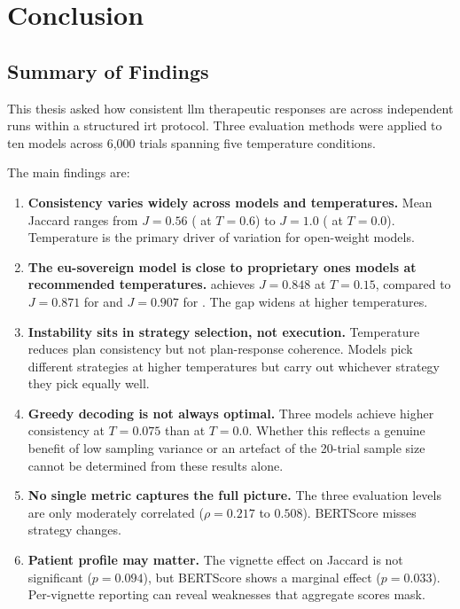 \chapter{Conclusion}
\label{chap:conclusion}

\section{Summary of Findings}
\label{sec:concl-summary}

This thesis asked how consistent \gls{llm} therapeutic responses are
across independent runs within a structured \gls{irt} protocol. Three
evaluation methods were applied to ten models across 6{,}000 trials
spanning five temperature conditions.

The main findings are:

\begin{enumerate}
  \item \textbf{Consistency varies widely across models and temperatures.}
    Mean Jaccard ranges from $J = 0.56$ ( at
    $T = 0.6$) to $J = 1.0$ ( at $T = 0.0$).
    Temperature is the primary driver of variation for open-weight models.

  \item \textbf{The \gls{eu}-sovereign model is close to proprietary ones
    models at recommended temperatures.} 
    achieves $J = 0.848$ at $T = 0.15$, compared to $J = 0.871$ for
     and $J = 0.907$ for . The
    gap widens at higher temperatures.

  \item \textbf{Instability sits in strategy selection, not execution.}
    Temperature reduces plan consistency but not plan-response coherence.
    Models pick different strategies at higher temperatures but carry out
    whichever strategy they pick equally well.

  \item \textbf{Greedy decoding is not always optimal.} Three models achieve
    higher consistency at $T = 0.075$ than at $T = 0.0$. Whether this
    reflects a genuine benefit of low sampling variance or an artefact of
    the 20-trial sample size cannot be determined from these results alone.

  \item \textbf{No single metric captures the full picture.}
    The three evaluation levels are only moderately correlated
    ($\rho = 0.217$ to $0.508$). BERTScore misses strategy changes.

  \item \textbf{Patient profile may matter.} The vignette effect on
    Jaccard is not significant ($p = 0.094$), but BERTScore shows a
    marginal effect ($p = 0.033$). Per-vignette reporting can reveal
    weaknesses that aggregate scores mask.
\end{enumerate}

